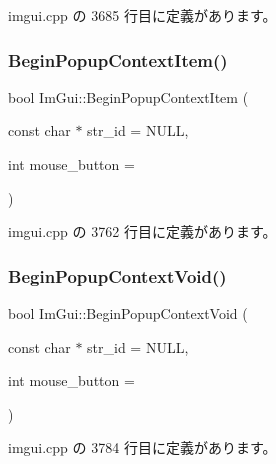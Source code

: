 imgui.\+cpp の 3685 行目に定義があります。

\mbox{\label{namespace_im_gui_a579fc507f5b5d164c8fd628aee3d7bbd}} 
\subsubsection{\texorpdfstring{Begin\+Popup\+Context\+Item()}{BeginPopupContextItem()}}
{\footnotesize\ttfamily bool Im\+Gui\+::\+Begin\+Popup\+Context\+Item (\begin{DoxyParamCaption}\item[{const char $\ast$}]{str\+\_\+id = {\ttfamily NULL},  }\item[{int}]{mouse\+\_\+button = {} }\end{DoxyParamCaption})}



 imgui.\+cpp の 3762 行目に定義があります。

\mbox{\label{namespace_im_gui_a87a2228929503fff067d2e167a690751}} 
\subsubsection{\texorpdfstring{Begin\+Popup\+Context\+Void()}{BeginPopupContextVoid()}}
{\footnotesize\ttfamily bool Im\+Gui\+::\+Begin\+Popup\+Context\+Void (\begin{DoxyParamCaption}\item[{const char $\ast$}]{str\+\_\+id = {\ttfamily NULL},  }\item[{int}]{mouse\+\_\+button = {} }\end{DoxyParamCaption})}



 imgui.\+cpp の 3784 行目に定義があります。

\mbox{\label{namespace_im_gui_acf98c99f041ea341d0328e071c56411b}} 
